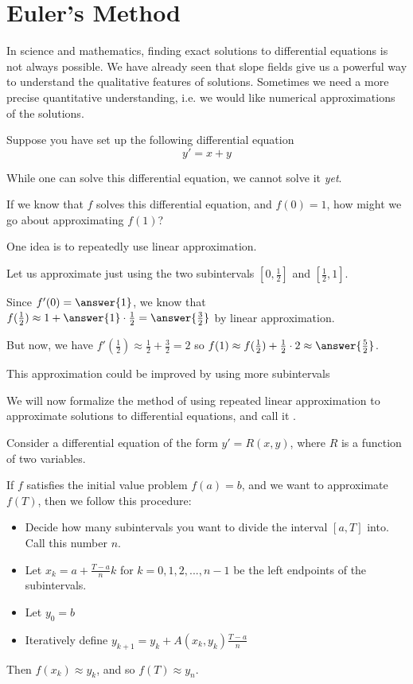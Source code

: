 \documentclass{ximera}
\begin{document}
\section{Euler's Method}

In science and mathematics, finding exact solutions to differential equations is not always possible.
We have already seen that slope fields give us a powerful way to understand the qualitative features of solutions.
Sometimes we need a more precise quantitative understanding, i.e. we would like numerical approximations of the solutions.

\begin{example}
Suppose you have set up the following differential equation
\[
y' = x+y
\]

While one can solve this differential equation, we cannot solve it
\textit{yet}. 

If we know that $f$ solves this differential equation, and $f(0) = 1$, how might we go about approximating $f(1)$?

One idea is to repeatedly use linear approximation.

Let us approximate just using the two subintervals $[0,\frac{1}{2}]$ and $[\frac{1}{2},1]$.

Since $f'(0) = \answer{1}$, we know that $f(\frac{1}{2}) \approx 1+\answer{1} \cdot \frac{1}{2} = \answer{\frac{3}{2}}$ by linear approximation.

But now, we have $f'(\frac{1}{2}) \approx \frac{1}{2}+\frac{3}{2} = 2$ so $f(1) \approx  f(\frac{1}{2})+\frac{1}{2} \cdot 2 \approx \answer{\frac{5}{2}}$.

This approximation could be improved by using more subintervals
\end{example}

We will now formalize the method of using repeated linear approximation to approximate solutions to differential equations, and call it .

\begin{definition}
Consider a differential equation of the form $y' = R(x,y)$, where $R$ is a function of two variables.

If $f$ satisfies the initial value problem $f(a) = b$, and we want to approximate $f(T)$, then we follow this procedure:

\begin{itemize}
	\item Decide how many subintervals you want to divide the interval $[a,T]$ into.  Call this number $n$.
	\item Let $x_k = a+\frac{T-a}{n}k$ for $k=0,1,2,...,n-1$ be the left endpoints of the subintervals.
	\item Let $y_0 = b$
	\item Iteratively define $y_{k+1} = y_k+A(x_k,y_k)\frac{T-a}{n}$ 
\end{itemize}

Then $f(x_k) \approx y_k$, and so $f(T) \approx y_{n}$.

\end{definition}
\end{document}
